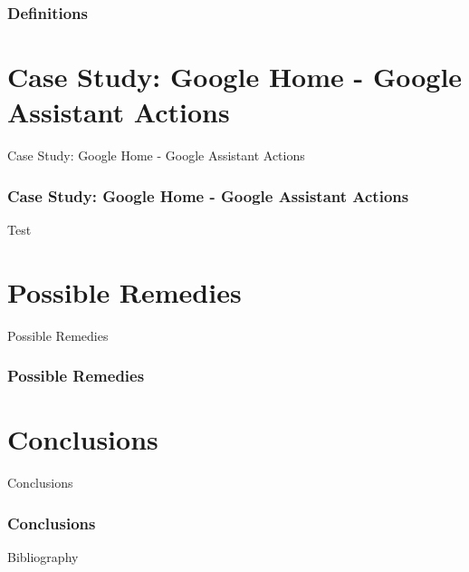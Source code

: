 \documentclass{beamer}
\begin{document}
\begin{frame}
\frametitle{Definitions}

\end{frame}

\section{Case Study: Google Home - Google Assistant Actions}

\begin{frame}
\begin{center} 
	 Case Study: Google Home - Google Assistant Actions
\end{center}
\end{frame}

\begin{frame}
\frametitle{Case Study: Google Home - Google Assistant Actions}
Test
\end{frame}

\section{Possible Remedies}

\begin{frame}
\begin{center} 
	 Possible Remedies
\end{center}
\end{frame}

\begin{frame}
\frametitle{Possible Remedies}

\end{frame}

\section{Conclusions}

\begin{frame}
\begin{center} 
	 Conclusions
\end{center}
\end{frame}

\begin{frame}
\frametitle{Conclusions}
\end{frame}

\nocite{*}
\begin{frame}{Bibliography}
\renewcommand*{\bibfont}{\footnotesize}
\printbibliography
\end{frame}
\end{document}
